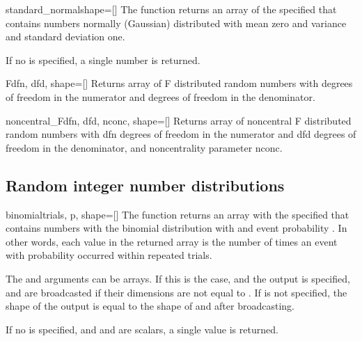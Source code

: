 \begin{funcdesc}{standard_normal}{shape=[]}
   The  function returns an array of the specified
    that contains  numbers normally (Gaussian)
   distributed with mean zero and variance and standard deviation one. 
   
   If no  is specified, a single number is returned.
\end{funcdesc}

\begin{funcdesc}{F}{dfn, dfd, shape=[]}
Returns array of F distributed random numbers with  degrees of freedom
in the numerator and  degrees of freedom in the denominator.
\end{funcdesc}

\begin{funcdesc}{noncentral_F}{dfn, dfd, nconc, shape=[]}
 Returns array of noncentral F distributed random numbers with dfn degrees of
 freedom in the numerator and dfd degrees of freedom in the denominator, and
 noncentrality parameter nconc.
\end{funcdesc}



\subsection{Random integer number distributions }
\label{sec:RA:int-distributions}

\begin{funcdesc}{binomial}{trials, p, shape=[]}
   The  function returns an array with the specified
    that contains  numbers with the binomial
   distribution with  and event probability . In other
   words, each value in the returned array is the number of times an event with
   probability  occurred within  repeated trials.
   
   The  and  arguments can be arrays. If this is the
   case, and the output  is specified,  and 
   are broadcasted if their dimensions are not equal to . If
    is not specified, the shape of the output is equal to the shape
   of  and  after broadcasting.
   
   If no  is specified, and  and  are scalars,
   a single value is returned.
\end{funcdesc}

